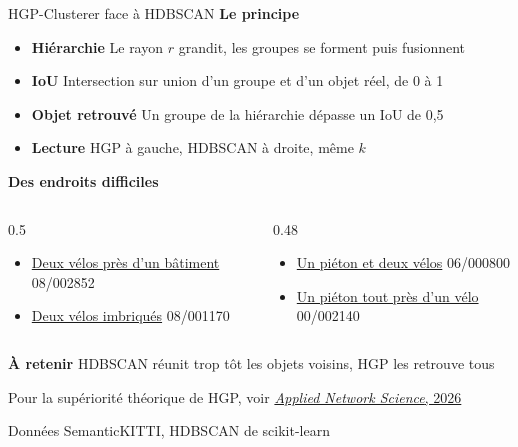 \documentclass[A4,svgnames,10pt,aspectratio=169,usepdftitle=false]{beamer}
\begin{document}
\begin{frame}{HGP-Clusterer face à HDBSCAN}
    \small
    \textbf{\bleu Le principe}
    \begin{itemize}
        \item \textbf{Hiérarchie} Le rayon $r$ grandit, les groupes se forment puis fusionnent
        \item \textbf{IoU} Intersection sur union d'un groupe et d'un objet réel, de 0 à 1
        \item \textbf{Objet retrouvé} Un groupe de la hiérarchie dépasse un IoU de 0,5
        \item \textbf{Lecture} HGP à gauche, HDBSCAN à droite, même $k$
    \end{itemize}

    \vspace{0.2cm}
    \textbf{\bleu Des endroits difficiles}
    \begin{columns}[T,onlytextwidth]
        \begin{column}{0.5\textwidth}
            \begin{itemize}
                \item \href{run:videos/08_002852_deux_velos_6_51_sans_sol_k5_clair.mp4}{Deux vélos près d'un bâtiment} {\scriptsize\textcolor{inria-2024-gris-bleu}{08/002852}}
                \item \href{run:videos/08_001170_deux_velos_43_57_sans_sol_k5_clair.mp4}{Deux vélos imbriqués} {\scriptsize\textcolor{inria-2024-gris-bleu}{08/001170}}
            \end{itemize}
        \end{column}
        \begin{column}{0.48\textwidth}
            \begin{itemize}
                \item \href{run:videos/06_000800_pieton_deux_velos_2_8_12_sans_sol_k10_clair.mp4}{Un piéton et deux vélos} {\scriptsize\textcolor{inria-2024-gris-bleu}{06/000800}}
                \item \href{run:videos/00_002140_pieton_velo_1_6_instances_k10_clair.mp4}{Un piéton tout près d'un vélo} {\scriptsize\textcolor{inria-2024-gris-bleu}{00/002140}}
            \end{itemize}
        \end{column}
    \end{columns}

    \vfill
    \textbf{\orange À retenir} HDBSCAN réunit trop tôt les objets voisins, HGP les retrouve tous

    Pour la supériorité théorique de HGP, voir \href{https://doi.org/10.1007/s41109-025-00756-1}{\emph{Applied Network Science}, 2026}

    \vspace{0.1cm}
    {\tiny \textcolor{inria-2024-gris-bleu}{Données SemanticKITTI, HDBSCAN de scikit-learn}\par}
\end{frame}
\end{document}

